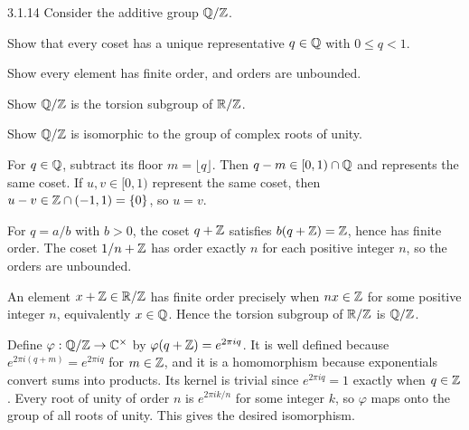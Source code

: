 \documentclass[11pt,oneside]{article}
\begin{document}

\begin{exercise}{3.1.14}
Consider the additive group $\mathbb{Q}/\mathbb{Z}$.
\begin{exercisesubparts}
\item Show that every coset has a unique representative $q\in\mathbb{Q}$ with $0\le q<1$.
\item Show every element has finite order, and orders are unbounded.
\item Show $\mathbb{Q}/\mathbb{Z}$ is the torsion subgroup of $\mathbb{R}/\mathbb{Z}$.
\item Show $\mathbb{Q}/\mathbb{Z}$ is isomorphic to the group of complex roots of unity.
\end{exercisesubparts}
\end{exercise}

\begin{solution}
\begin{exercisesubparts}
\item For $q\in\mathbb{Q}$, subtract its floor $m=\lfloor q\rfloor$. Then $q-m\in[0,1)\cap\mathbb{Q}$ and represents the same coset. If $u,v\in[0,1)$ represent the same coset, then $u-v\in\mathbb{Z}\cap(-1,1)=\{0\}$, so $u=v$.
\item For $q=a/b$ with $b>0$, the coset $q+\mathbb{Z}$ satisfies $b(q+\mathbb{Z})=\mathbb{Z}$, hence has finite order. The coset $1/n+\mathbb{Z}$ has order exactly $n$ for each positive integer $n$, so the orders are unbounded.
\item An element $x+\mathbb{Z}\in\mathbb{R}/\mathbb{Z}$ has finite order precisely when $nx\in\mathbb{Z}$ for some positive integer $n$, equivalently $x\in\mathbb{Q}$. Hence the torsion subgroup of $\mathbb{R}/\mathbb{Z}$ is $\mathbb{Q}/\mathbb{Z}$.
\item Define $\varphi:\mathbb{Q}/\mathbb{Z}\to\mathbb{C}^\times$ by $\varphi(q+\mathbb{Z})=e^{2\pi iq}$. It is well defined because $e^{2\pi i(q+m)}=e^{2\pi iq}$ for $m\in\mathbb{Z}$, and it is a homomorphism because exponentials convert sums into products. Its kernel is trivial since $e^{2\pi iq}=1$ exactly when $q\in\mathbb{Z}$. Every root of unity of order $n$ is $e^{2\pi ik/n}$ for some integer $k$, so $\varphi$ maps onto the group of all roots of unity. This gives the desired isomorphism.
\end{exercisesubparts}
\end{solution}
\end{document}
